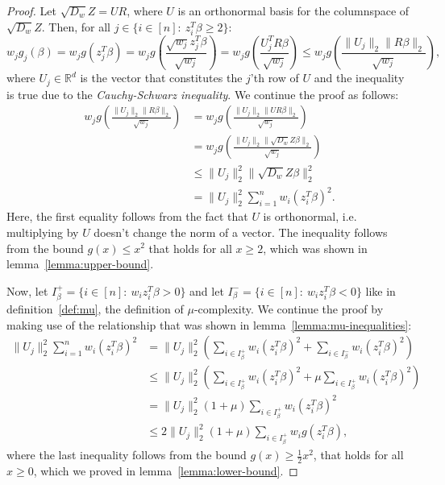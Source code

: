 \begin{proof}
    Let $\sqrt{D_w} Z = UR$, where $U$ is an orthonormal basis for the columnspace
    of $\sqrt{D_w} Z$. Then, for all $j \in \{i \in [n]:\ z_i^T \beta \geq 2 \}$:
    \begin{equation*}
        w_jg_j(\beta) = w_j g(z_j^T \beta)
        = w_j g\left(\frac{\sqrt{w_j} z_j^T \beta}{\sqrt{w_j}}\right)
        = w_j g\left(\frac{U_j^T R \beta}{\sqrt{w_j}}\right)
        \leq w_j g\left(\frac{\lVert U_j \rVert_2 \lVert R \beta \rVert_2}{\sqrt{w_j}}\right),
    \end{equation*}
    where $U_j \in \mathbb{R}^d$ is the vector that constitutes the $j$'th
    row of $U$ and the inequality is true due to the
    \textit{Cauchy-Schwarz inequality}. We continue the proof as follows:
    \begin{align*}
        w_j g\left(\frac{\lVert U_j \rVert_2 \lVert R \beta \rVert_2}{\sqrt{w_j}}\right)
         & = w_j g\left(\frac{\lVert U_j \rVert_2 \lVert U R \beta \rVert_2}{\sqrt{w_j}}\right)          \\
         & = w_j g\left(\frac{\lVert U_j \rVert_2 \lVert \sqrt{D_w} Z \beta \rVert_2}{\sqrt{w_j}}\right) \\
         & \leq \lVert U_j \rVert_2^2 \lVert \sqrt{D_w} Z \beta \rVert_2^2                               \\
         & = \lVert U_j \rVert_2^2 \sum_{i=1}^n w_i (z_i^T \beta)^2.
    \end{align*}
    Here, the first equality follows from the fact that $U$ is orthonormal, i.e.
    multiplying by $U$ doesn't change the norm of a vector.
    The inequality follows from the bound $g(x) \leq x^2$ that holds for
    all $x \geq 2$, which was shown in lemma~\ref{lemma:upper-bound}.

    Now, let $I_\beta^+ = \{i \in [n]:\ w_i z_i^T \beta > 0 \}$
    and let $I_\beta^- = \{i \in [n]:\ w_i z_i^T \beta < 0 \}$ like in
    definition~\ref{def:mu}, the definition of $\mu$-complexity.
    We continue the proof by making use of the relationship that
    was shown in lemma~\ref{lemma:mu-inequalities}:
    \begin{align*}
        \lVert U_j \rVert_2^2 \sum_{i=1}^n w_i (z_i^T \beta)^2
         & = \lVert U_j \rVert_2^2 \left( \sum_{i \in I_\beta^+} w_i (z_i^T \beta)^2 + \sum_{i \in I_\beta^-} w_i (z_i^T \beta)^2 \right)        \\
         & \leq \lVert U_j \rVert_2^2 \left( \sum_{i \in I_\beta^+} w_i (z_i^T \beta)^2 + \mu \sum_{i \in I_\beta^+} w_i (z_i^T \beta)^2 \right) \\
         & = \lVert U_j \rVert_2^2 (1 + \mu) \sum_{i \in I_\beta^+} w_i (z_i^T \beta)^2                                                          \\
         & \leq 2 \lVert U_j \rVert_2^2 (1 + \mu) \sum_{i \in I_\beta^+} w_i g(z_i^T \beta),
    \end{align*}
    where the last inequality follows from the bound
    $g(x) \geq \frac{1}{2}x^2$, that holds for all $x \geq 0$,
    which we proved in lemma~\ref{lemma:lower-bound}.


\end{proof}
